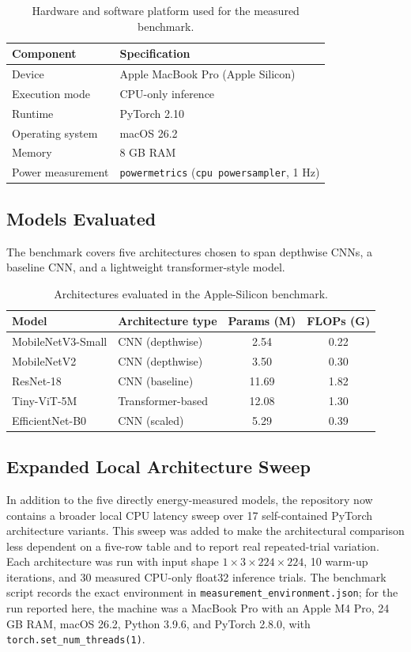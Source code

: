 \documentclass[11pt]{article}
\begin{document}
\begin{table}[ht]
\centering
\caption{Hardware and software platform used for the measured benchmark.}
\begin{tabular}{ll}
\toprule
Component & Specification \\
\midrule
Device & Apple MacBook Pro (Apple Silicon) \\
Execution mode & CPU-only inference \\
Runtime & PyTorch 2.10 \\
Operating system & macOS 26.2 \\
Memory & 8 GB RAM \\
Power measurement & \texttt{powermetrics} (\texttt{cpu powersampler}, 1 Hz) \\
\bottomrule
\end{tabular}
\end{table}

\subsection{Models Evaluated}
The benchmark covers five architectures chosen to span depthwise CNNs, a
baseline CNN, and a lightweight transformer-style model.

\begin{table}[ht]
\centering
\caption{Architectures evaluated in the Apple-Silicon benchmark.}
\begin{tabular}{l l S[table-format=2.2] S[table-format=1.2]}
\toprule
Model & Architecture type & {Params (M)} & {FLOPs (G)} \\
\midrule
MobileNetV3-Small & CNN (depthwise) & 2.54 & 0.22 \\
MobileNetV2 & CNN (depthwise) & 3.50 & 0.30 \\
ResNet-18 & CNN (baseline) & 11.69 & 1.82 \\
Tiny-ViT-5M & Transformer-based & 12.08 & 1.30 \\
EfficientNet-B0 & CNN (scaled) & 5.29 & 0.39 \\
\bottomrule
\end{tabular}
\end{table}

\subsection{Expanded Local Architecture Sweep}
In addition to the five directly energy-measured models, the repository now
contains a broader local CPU latency sweep over 17 self-contained PyTorch
architecture variants. This sweep was added to make the architectural comparison
less dependent on a five-row table and to report real repeated-trial variation.
Each architecture was run with input shape $1 \times 3 \times 224 \times 224$,
10 warm-up iterations, and 30 measured CPU-only float32 inference trials. The
benchmark script records the exact environment in
\texttt{measurement\_environment.json}; for the run reported here, the machine
was a MacBook Pro with an Apple M4 Pro, 24 GB RAM, macOS 26.2, Python 3.9.6,
and PyTorch 2.8.0, with \texttt{torch.set\_num\_threads(1)}.
\end{document}
